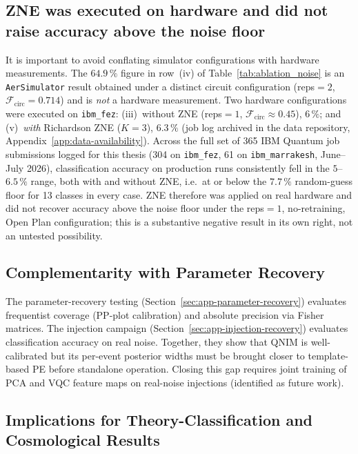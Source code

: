 \documentclass[11pt,a4paper, english]{book}
\theoremstyle{plain}
\theoremstyle{definition}
\numberwithin{equation}{chapter}
\numberwithin{figure}{chapter}
\numberwithin{table}{chapter}
\begin{document}
\subsection{ZNE was executed on hardware and did not raise accuracy above the noise floor}

It is important to avoid conflating simulator configurations with hardware
measurements. The $64.9\,\%$ figure in row~(iv) of Table~\ref{tab:ablation_noise}
is an \texttt{AerSimulator} result obtained under a distinct circuit
configuration (reps$=2$, $\mathcal{F}_\mathrm{circ}=0.714$) and is
\emph{not} a hardware measurement. Two hardware configurations were
executed on \texttt{ibm\_fez}: (iii)~without ZNE (reps$=1$,
$\mathcal{F}_\mathrm{circ}\approx0.45$), $6\,\%$; and
(v)~\emph{with} Richardson ZNE ($K=3$), $6.3\,\%$
(job log archived in the data repository,
Appendix~\ref{app:data-availability}). Across the full set of 365
IBM Quantum job submissions logged for this thesis (304 on
\texttt{ibm\_fez}, 61 on \texttt{ibm\_marrakesh}, June--July 2026),
classification accuracy on production runs consistently fell in the
$5$--$6.5\,\%$ range, both with and without ZNE, i.e.\ at or below the
$7.7\,\%$ random-guess floor for 13 classes in every case. ZNE therefore
was applied on real hardware and did not recover accuracy above the noise
floor under the reps$=1$, no-retraining, Open Plan configuration; this is
a substantive negative result in its own right, not an untested
possibility.

\subsection{Complementarity with Parameter Recovery}

The parameter-recovery testing (Section~\ref{sec:app-parameter-recovery}) evaluates frequentist coverage (PP-plot calibration) and absolute precision via Fisher matrices. The injection campaign (Section~\ref{sec:app-injection-recovery}) evaluates classification accuracy on real noise. Together, they show that QNIM is well-calibrated but its per-event posterior widths must be brought closer to template-based PE before standalone operation. Closing this gap requires joint training of PCA and VQC feature maps on real-noise injections (identified as future work).

\subsection{Implications for Theory-Classification and Cosmological Results}
\end{document}
